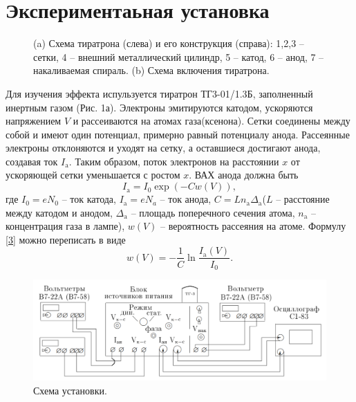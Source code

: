 \documentclass[a4paper]{article}
\begin{document}
\section{Экспериментаьная установка}
\begin{figure}[h]
  \centering
  \caption{(a) Схема тиратрона (слева) и его конструкция (справа): 1,2,3 -- сетки, 4 -- внешний металлический цилиндр, 5 -- катод, 6 -- анод, 7 -- накаливаемая спираль. (b) Схема включения тиратрона.}
\end{figure}
Для изучения эффекта испульзуется тиратрон ТГ3-01/1.3Б, заполненный инертным газом (Рис. 1а). Электроны эмитируются катодом, ускоряются напряжением $V$ и рассеиваются на атомах газа(ксенона). Сетки соединены между собой и имеют один потенциал, примерно равный потенциалу анода. Рассеянные электроны отклоняются и уходят на сетку, а оставшиеся достигают анода, создавая ток $I_\text{a}$. Таким образом, поток электронов на расстоянии $x$ от ускоряющей сетки уменьшается с ростом $x$. ВАХ анода должна быть
\begin{equation}\label{3}
I_\text{a} = I_0 \exp\left( - C w(V) \right),
\end{equation}
где $I_0 = eN_0$ -- ток катода, $I_\text{a} = eN_a$ -- ток анода, $C = Ln_\text{a} \Delta_\text{a}$($L$ --  расстояние между катодом и анодом, $\Delta_\text{a}$ -- площадь поперечного сечения атома, $n_\text{a}$ -- концентрация газа в лампе), $w(V)$ -- вероятность рассеяния на атоме.
Формулу \eqref{3} можно переписать в виде
\[\tag{5a}\label{5a}
w(V) = -\dfrac{1}{C}\ln \dfrac{I_\text{a}(V)}{I_0}.
\]
\begin{figure}[H]
\includegraphics[scale=0.5]{1.png}
\centering
\caption{Схема установки.}
\end{figure}
\end{document}
